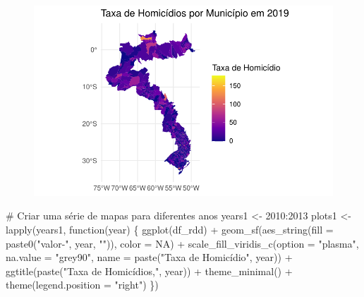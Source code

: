 \documentclass[
  letterpaper,
  DIV=11,
  numbers=noendperiod]{scrartcl}
\newenvironment{Shaded}{\begin{snugshade}}{\end{snugshade}}
\newcommand{\AttributeTok}[1]{\textcolor[rgb]{0.40,0.45,0.13}{#1}}
\newcommand{\CommentTok}[1]{\textcolor[rgb]{0.37,0.37,0.37}{#1}}
\newcommand{\ConstantTok}[1]{\textcolor[rgb]{0.56,0.35,0.01}{#1}}
\newcommand{\ControlFlowTok}[1]{\textcolor[rgb]{0.00,0.23,0.31}{#1}}
\newcommand{\DecValTok}[1]{\textcolor[rgb]{0.68,0.00,0.00}{#1}}
\newcommand{\FunctionTok}[1]{\textcolor[rgb]{0.28,0.35,0.67}{#1}}
\newcommand{\NormalTok}[1]{\textcolor[rgb]{0.00,0.23,0.31}{#1}}
\newcommand{\OtherTok}[1]{\textcolor[rgb]{0.00,0.23,0.31}{#1}}
\newcommand{\SpecialCharTok}[1]{\textcolor[rgb]{0.37,0.37,0.37}{#1}}
\newcommand{\StringTok}[1]{\textcolor[rgb]{0.13,0.47,0.30}{#1}}
\begin{document}
\begin{figure}[H]

{\centering \includegraphics{maps_files/figure-pdf/unnamed-chunk-23-1.pdf}

}

\end{figure}

\begin{Shaded}
\begin{Highlighting}[]
\CommentTok{\# Criar uma série de mapas para diferentes anos}
\NormalTok{years1 }\OtherTok{\textless{}{-}} \DecValTok{2010}\SpecialCharTok{:}\DecValTok{2013}
\NormalTok{plots1 }\OtherTok{\textless{}{-}} \FunctionTok{lapply}\NormalTok{(years1, }\ControlFlowTok{function}\NormalTok{(year) \{}
  \FunctionTok{ggplot}\NormalTok{(df\_rdd) }\SpecialCharTok{+}
    \FunctionTok{geom\_sf}\NormalTok{(}\FunctionTok{aes\_string}\NormalTok{(}\AttributeTok{fill =} \FunctionTok{paste0}\NormalTok{(}\StringTok{"\textasciigrave{}valor{-}"}\NormalTok{, year, }\StringTok{"\textasciigrave{}"}\NormalTok{)), }\AttributeTok{color =} \ConstantTok{NA}\NormalTok{) }\SpecialCharTok{+}
    \FunctionTok{scale\_fill\_viridis\_c}\NormalTok{(}\AttributeTok{option =} \StringTok{"plasma"}\NormalTok{, }\AttributeTok{na.value =} \StringTok{"grey90"}\NormalTok{, }\AttributeTok{name =} \FunctionTok{paste}\NormalTok{(}\StringTok{"Taxa de Homicídio"}\NormalTok{, year)) }\SpecialCharTok{+}
    \FunctionTok{ggtitle}\NormalTok{(}\FunctionTok{paste}\NormalTok{(}\StringTok{"Taxa de Homicídios,"}\NormalTok{, year)) }\SpecialCharTok{+}
    \FunctionTok{theme\_minimal}\NormalTok{() }\SpecialCharTok{+}
    \FunctionTok{theme}\NormalTok{(}\AttributeTok{legend.position =} \StringTok{"right"}\NormalTok{)}
\NormalTok{\})}
\end{Highlighting}
\end{Shaded}
\end{document}
